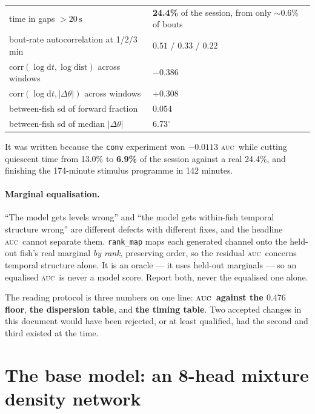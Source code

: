 \documentclass[11pt,a4paper]{article}
\newcommand{\uu}[1]{\ensuremath{\,\mathrm{#1}}}  %
\newcommand{\dg}{\ensuremath{^\circ}}             %
\newcommand{\dth}{\ensuremath{\Delta\theta}}
\newcommand{\auc}{\textsc{auc}}
\newcommand{\code}[1]{\texttt{\small #1}}
\begin{document}
\begin{center}\small
\begin{tabular}{ll}
\toprule
time in gaps $>20\uu{s}$ & \textbf{24.4\%} of the session, from only $\sim$0.6\% of bouts \\
bout-rate autocorrelation at 1/2/3\,min & $0.51$ / $0.33$ / $0.22$ \\
$\mathrm{corr}(\log \mathrm{d}t, \log \mathrm{dist})$ across windows & $-0.386$ \\
$\mathrm{corr}(\log \mathrm{d}t, |\dth|)$ across windows & $+0.308$ \\
between-fish sd of forward fraction & $0.054$ \\
between-fish sd of median $|\dth|$ & 6.73\dg{} \\
\bottomrule
\end{tabular}
\end{center}

It was written because the \code{conv} experiment won $-0.0113$ \auc\ while cutting
quiescent time from 13.0\% to \textbf{6.9\%} of the session against a real 24.4\%, and
finishing the 174-minute stimulus programme in 142 minutes.

\paragraph{Marginal equalisation.}
``The model gets levels wrong'' and ``the model gets within-fish temporal structure
wrong'' are different defects with different fixes, and the headline \auc\ cannot
separate them. \code{rank\_map} maps each generated channel onto the held-out fish's real
marginal \emph{by rank}, preserving order, so the residual \auc\ concerns temporal
structure alone. It is an oracle --- it uses held-out marginals --- so an equalised \auc\
is never a model score. Report both, never the equalised one alone.

\begin{takeaway}
The reading protocol is three numbers on one line: \textbf{\auc\ against the $0.476$
floor}, \textbf{the dispersion table}, and \textbf{the timing table}. Two accepted
changes in this document would have been rejected, or at least qualified, had the second
and third existed at the time.
\end{takeaway}

\section{The base model: an 8-head mixture density network}\label{sec:base}
\end{document}
